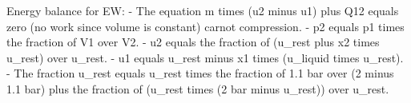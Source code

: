 Energy balance for EW:
- The equation m times (u2 minus u1) plus Q12 equals zero (no work since volume is constant) carnot compression.
- p2 equals p1 times the fraction of V1 over V2.
- u2 equals the fraction of (u_rest plus x2 times u_rest) over u_rest.
- u1 equals u_rest minus x1 times (u_liquid times u_rest).
- The fraction u_rest equals u_rest times the fraction of 1.1 bar over (2 minus 1.1 bar) plus the fraction of (u_rest times (2 bar minus u_rest)) over u_rest.